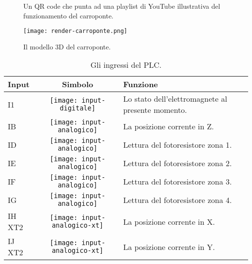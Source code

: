 \begin{figure}[htbp]\centering
    \caption{Un QR code che punta ad una playlist di YouTube illustrativa del funzionamento del carroponte.}
\end{figure}

\begin{figure}[htbp]\centering
    \caption{Il modello 3D del carroponte.}
    \texttt{[image: render-carroponte.png]}
\end{figure}

\begin{table}[htbp]\centering
    \caption{Gli ingressi del PLC.}
    \begin{tabularx}{\columnwidth}{@{}lcX@{}}\toprule
        \textbf{Input} & \textbf{Simbolo}                                 & \textbf{Funzione}                                 \\ \midrule
        I1             & \texttt{[image: input-digitale]}     & Lo stato dell'elettromagnete al presente momento. \\
        IB             & \texttt{[image: input-analogico]}    & La posizione corrente in Z.                       \\
        ID             & \texttt{[image: input-analogico]}    & Lettura del fotoresistore zona 1.                 \\
        IE             & \texttt{[image: input-analogico]}    & Lettura del fotoresistore zona 2.                 \\
        IF             & \texttt{[image: input-analogico]}    & Lettura del fotoresistore zona 3.                 \\
        IG             & \texttt{[image: input-analogico]}    & Lettura del fotoresistore zona 4.                 \\
        IH XT2         & \texttt{[image: input-analogico-xt]} & La posizione corrente in X.                       \\
        IJ XT2         & \texttt{[image: input-analogico-xt]} & La posizione corrente in Y.                       \\
    \bottomrule\end{tabularx}
\end{table}

